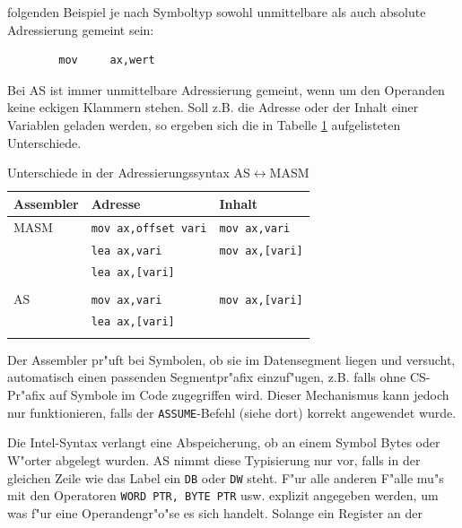 \documentclass[12pt,a4paper,twoside]{report}
\newcommand{\tty}[1]{{\tt #1}}
\newcommand{\asname}{AS}
\begin{document}
folgenden Beispiel je nach Symboltyp sowohl unmittelbare als auch absolute
Adressierung gemeint sein:
\begin{verbatim}
        mov     ax,wert
\end{verbatim}
Bei \asname{} ist immer unmittelbare Adressierung gemeint, wenn um den Operanden
keine eckigen Klammern stehen.  Soll z.B. die Adresse oder der Inhalt einer
Variablen geladen werden, so ergeben sich die in Tabelle \ref{TabMASM}
aufgelisteten Unterschiede.
\begin{table}
\begin{center}\begin{tabular}{|l|l|l|}
\hline
Assembler  & Adresse                  & Inhalt                 \\
\hline
\hline
MASM       & \tty{mov ax,offset vari} & \tty{mov ax,vari}      \\
           & \tty{lea ax,vari}        & \tty{mov ax,[vari]}    \\
           & \tty{lea ax,[vari]}      &                        \\
           &                          &                        \\
\asname{}         & \tty{mov ax,vari}        & \tty{mov ax,[vari]}    \\
           & \tty{lea ax,[vari]}      &                        \\
           &                          &                        \\
\hline
\end{tabular}\end{center}
\caption{Unterschiede in der Adressierungssyntax \asname{}$\leftrightarrow$MASM\label{TabMASM}}
\normalsize
\end{table}
\par
Der Assembler pr"uft bei Symbolen, ob sie im Datensegment liegen und
versucht, automatisch einen passenden Segmentpr"afix einzuf"ugen, z.B.
falls ohne CS-Pr"afix auf Symbole im Code zugegriffen wird.  Dieser
Mechanismus kann jedoch nur funktionieren, falls der \tty{ASSUME}-Befehl
(siehe dort) korrekt angewendet wurde.
\par
Die Intel-Syntax verlangt eine Abspeicherung, ob an einem Symbol Bytes oder
W"orter abgelegt wurden.  \asname{} nimmt diese Typisierung nur vor, falls in der
gleichen Zeile wie das Label ein \tty{DB} oder \tty{DW} steht.  F"ur alle anderen F"alle
mu"s mit den Operatoren \tty{WORD PTR, BYTE PTR} usw. explizit angegeben werden,
um was f"ur eine Operandengr"o"se es sich handelt.  Solange ein Register an der
\end{document}
